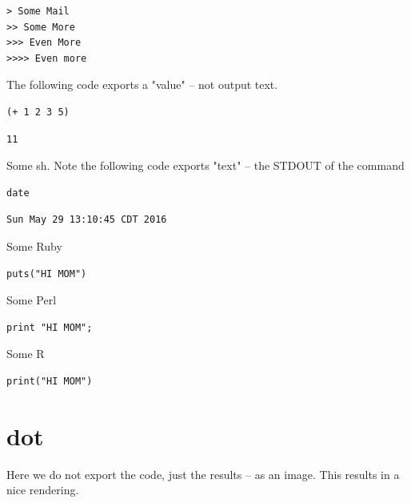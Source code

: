 \documentclass[11pt]{article}
\begin{document}
\begin{verbatim}
> Some Mail
>> Some More
>>> Even More
>>>> Even more
\end{verbatim}

The following code exports a "value" -- not output text.

\begin{verbatim}
(+ 1 2 3 5)
\end{verbatim}

\begin{verbatim}
11
\end{verbatim}

Some sh.  Note the following code exports "text" -- the STDOUT of the command

\begin{verbatim}
date
\end{verbatim}

\begin{verbatim}
Sun May 29 13:10:45 CDT 2016
\end{verbatim}

Some Ruby

\begin{verbatim}
puts("HI MOM")
\end{verbatim}

Some Perl

\begin{verbatim}
print "HI MOM";
\end{verbatim}

Some R

\begin{verbatim}
print("HI MOM")
\end{verbatim}

\section{dot}
\label{sec-7}

Here we do not export the code, just the results -- as an image.  This results in a nice rendering.
\end{document}
